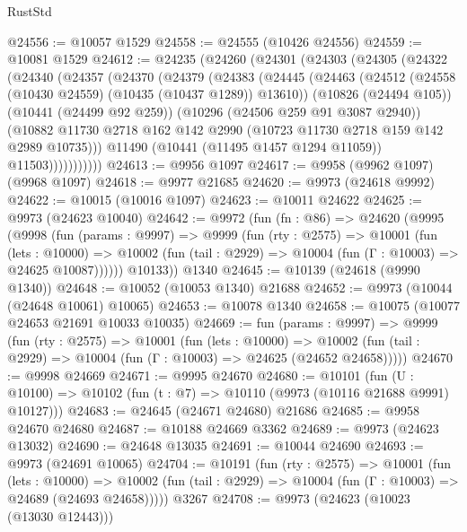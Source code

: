 \begin{lexlean}{RustStd}
\begin{coremodule}
@24556 := @10057 @1529
@24558 := @24555 (@10426 @24556)
@24559 := @10081 @1529
@24612 := @24235
    (@24260
      (@24301
        (@24303
          (@24305
            (@24322
              (@24340
                (@24357
                  (@24370
                    (@24379
                      (@24383
                        (@24445
                          (@24463
                            (@24512 (@24558 (@10430 @24559) (@10435 (@10437 @1289)) @13610))
                            (@10826 (@24494 @105))
                            (@10441 (@24499 @92 @259))
                            (@10296 (@24506 @259 @91 @3087 @2940))
                            (@10882
                              @11730
                              @2718
                              @162
                              @142
                              @2990
                              (@10723 @11730 @2718 @159 @142 @2989 @10735)))
                          @11490
                          (@10441 (@11495 @1457 @1294 @11059))
                          @11503)))))))))))
@24613 := @9956 @1097
@24617 := @9958 (@9962 @1097) (@9968 @1097)
@24618 := @9977 @21685
@24620 := @9973 (@24618 @9992)
@24622 := @10015 (@10016 @1097)
@24623 := @10011 @24622
@24625 := @9973 (@24623 @10040)
@24642 := @9972
    (fun (fn : @86) =>
    @24620
      (@9995
        (@9998
          (fun (params : @9997) =>
          @9999
            (fun (rty : @2575) =>
            @10001
              (fun (lets : @10000) =>
              @10002 (fun (tail : @2929) => @10004 (fun (Γ : @10003) => @24625 @10087))))))
        @10133))
    @1340
@24645 := @10139 (@24618 (@9990 @1340))
@24648 := @10052 (@10053 @1340) @21688
@24652 := @9973 (@10044 (@24648 @10061) @10065)
@24653 := @10078 @1340
@24658 := @10075 (@10077 @24653 @21691 @10033 @10035)
@24669 := fun (params : @9997) =>
  @9999
    (fun (rty : @2575) =>
    @10001
      (fun (lets : @10000) =>
      @10002 (fun (tail : @2929) => @10004 (fun (Γ : @10003) => @24625 (@24652 @24658)))))
@24670 := @9998 @24669
@24671 := @9995 @24670
@24680 := @10101
    (fun (U : @10100) => @10102 (fun (t : @7) => @10110 (@9973 (@10116 @21688 @9991) @10127)))
@24683 := @24645 (@24671 @24680) @21686
@24685 := @9958 @24670 @24680
@24687 := @10188 @24669 @3362
@24689 := @9973 (@24623 @13032)
@24690 := @24648 @13035
@24691 := @10044 @24690
@24693 := @9973 (@24691 @10065)
@24704 := @10191
    (fun (rty : @2575) =>
    @10001
      (fun (lets : @10000) =>
      @10002 (fun (tail : @2929) => @10004 (fun (Γ : @10003) => @24689 (@24693 @24658)))))
    @3267
@24708 := @9973 (@24623 (@10023 (@13030 @12443)))

\end{coremodule}
\end{lexlean}
